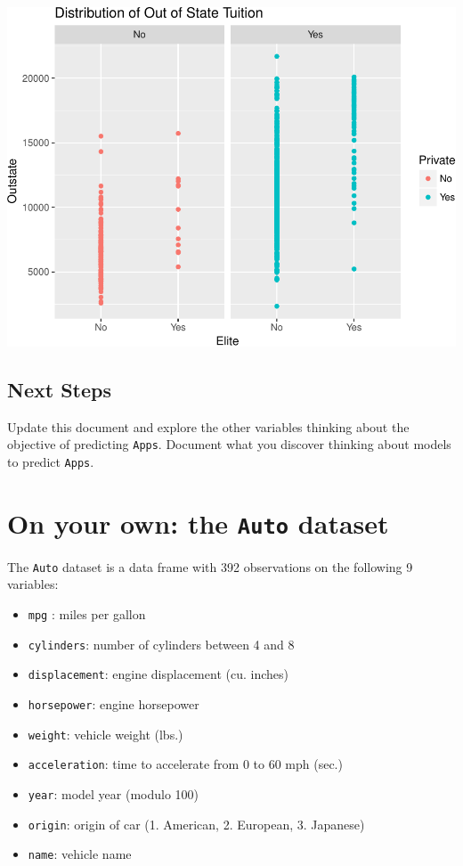 \documentclass[]{article}
\providecommand{\tightlist}{%
  \setlength{\itemsep}{0pt}\setlength{\parskip}{0pt}}
\begin{document}
\begin{center}\includegraphics{Lab1Q_files/figure-latex/unnamed-chunk-12-1} \end{center}

\subsection{Next Steps}\label{next-steps}

Update this document and explore the other variables thinking about the
objective of predicting \texttt{Apps}. Document what you discover
thinking about models to predict \texttt{Apps}.

\section{\texorpdfstring{On your own: the \texttt{Auto}
dataset}{On your own: the Auto dataset}}\label{on-your-own-the-auto-dataset}

The \texttt{Auto} dataset is a data frame with 392 observations on the
following 9 variables:

\begin{itemize}
\tightlist
\item
  \texttt{mpg} : miles per gallon
\item
  \texttt{cylinders}: number of cylinders between 4 and 8
\item
  \texttt{displacement}: engine displacement (cu. inches)
\item
  \texttt{horsepower}: engine horsepower
\item
  \texttt{weight}: vehicle weight (lbs.)
\item
  \texttt{acceleration}: time to accelerate from 0 to 60 mph (sec.)
\item
  \texttt{year}: model year (modulo 100)
\item
  \texttt{origin}: origin of car (1. American, 2. European, 3. Japanese)
\item
  \texttt{name}: vehicle name
\end{itemize}
\end{document}
